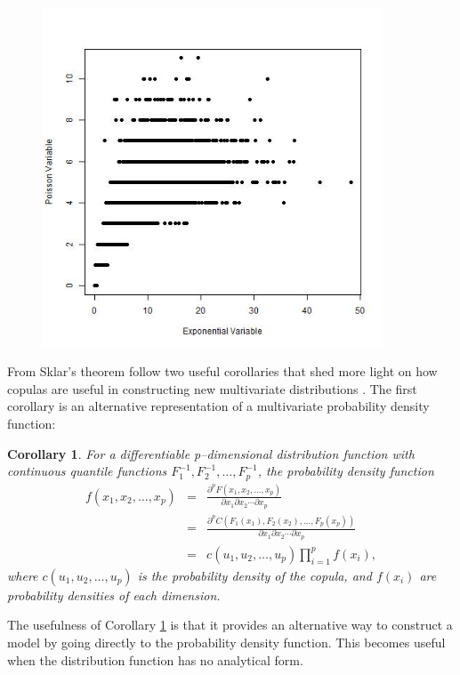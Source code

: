 \documentclass[12pt]{article}
\begin{document}
\begin{figure}
\centering
\includegraphics[width=0.9\textwidth]{Copula_model_ex}
\caption{}
\label{fig:newdist}
\end{figure}
% 
    
From  Sklar's theorem follow two useful
corollaries that shed more light on how copulas
are useful in constructing new multivariate distributions
\citep{Joe1997,Nel2007}. The first corollary is an alternative
representation of a multivariate probability density function:
%
\newtheorem{cors}{Corollary}
\begin{cors}
\label{thm:density}
For a differentiable p--dimensional distribution function with
continuous quantile functions $F_1^{-1},
F_2^{-1}, \dots, F_p^{-1}$, the probability density function
%
\begin{eqnarray}
f(x_1,x_2, \dots, x_p) & = &
\frac{\partial^p F(x_1, x_2, \dots, x_p)}{\partial x_1 \partial x_2 \cdots \partial x_p} \nonumber \\ 
 & = & \frac{\partial^p C(F_1(x_1), F_2(x_2), \dots, F_p(x_p))}{\partial x_1 \partial x_2 \cdots \partial x_p} \nonumber \\
 & = & c(u_1, u_2, \dots, u_p)\prod_{i = 1}^p f(x_i),
\end{eqnarray}
where $c(u_1, u_2, \dots, u_p)$ is the probability density of the copula, and $f(x_i)$ are probability densities of each dimension.
\end{cors}
%
The usefulness of
Corollary \ref{thm:density} is that it provides an alternative
way to construct a model by going directly to the probability density
function. This becomes useful when the distribution function has no analytical form. 
\end{document}

